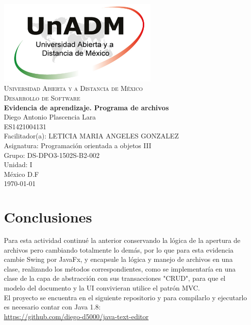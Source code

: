 \documentclass[spanish,12pt,letterpapper]{article}
\begin{document}
	\begin{titlepage}
		\begin{center}
			\includegraphics[width=0.6\textwidth]{../logoUnADM}~\\[1cm] 
			\textsc{Universidad Abierta y a Distancia de México}\\[0.8cm]
			\textsc{Desarrollo de Software}\\[1.8cm]
			
			\textbf{ \Large Evidencia de aprendizaje. Programa de archivos}\\[3cm]
			
			Diego Antonio Plascencia Lara\\ ES1421004131 \\[0.4cm]
			Facilitador(a): LETICIA MARIA ANGELES GONZALEZ\\
			Asignatura: Programación orientada a objetos III\\
			Grupo: DS-DPO3-1502S-B2-002 \\
			Unidad: I \\
			
			\vfill México D.F\\{\today}
			
		\end{center}
	\end{titlepage}
	
	\section{Conclusiones}
	Para esta actividad continué la anterior conservando la lógica de la apertura de archivos pero cambiando totalmente lo demás, por lo que para esta evidencia cambie Swing por JavaFx, y encapsule la lógica y manejo de archivos en una clase, realizando los métodos correspondientes, como se implementaría en una clase de la capa de abstracción con sus transacciones "CRUD", para que el modelo del documento y la UI convivieran utilice el patrón MVC.\\
	
	El proyecto se encuentra en el siguiente repositorio y para compilarlo y ejecutarlo es necesario contar con Java 1.8:\\
	
	\url{https://github.com/diego-d5000/java-text-editor} \\
	
\end{document}
